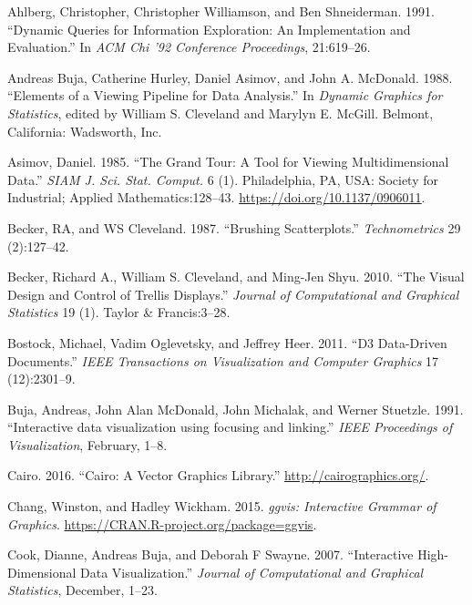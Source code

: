\documentclass[12pt,]{article}
\theoremstyle{definition}
\theoremstyle{definition}
\theoremstyle{definition}
\theoremstyle{remark}
\begin{document}
\hypertarget{refs}{}
\leavevmode\hypertarget{ref-Ahlberg:1991}{}%
Ahlberg, Christopher, Christopher Williamson, and Ben Shneiderman. 1991.
``Dynamic Queries for Information Exploration: An Implementation and
Evaluation.'' In \emph{ACM Chi '92 Conference Proceedings}, 21:619--26.

\leavevmode\hypertarget{ref-viewing-pipeline}{}%
Andreas Buja, Catherine Hurley, Daniel Asimov, and John A. McDonald.
1988. ``Elements of a Viewing Pipeline for Data Analysis.'' In
\emph{Dynamic Graphics for Statistics}, edited by William S. Cleveland
and Marylyn E. McGill. Belmont, California: Wadsworth, Inc.

\leavevmode\hypertarget{ref-grand-tour}{}%
Asimov, Daniel. 1985. ``The Grand Tour: A Tool for Viewing
Multidimensional Data.'' \emph{SIAM J. Sci. Stat. Comput.} 6 (1).
Philadelphia, PA, USA: Society for Industrial; Applied
Mathematics:128--43. \url{https://doi.org/10.1137/0906011}.

\leavevmode\hypertarget{ref-brushing-scatterplots}{}%
Becker, RA, and WS Cleveland. 1987. ``Brushing Scatterplots.''
\emph{Technometrics} 29 (2):127--42.

\leavevmode\hypertarget{ref-trellis}{}%
Becker, Richard A., William S. Cleveland, and Ming-Jen Shyu. 2010. ``The
Visual Design and Control of Trellis Displays.'' \emph{Journal of
Computational and Graphical Statistics} 19 (1). Taylor \& Francis:3--28.

\leavevmode\hypertarget{ref-d3}{}%
Bostock, Michael, Vadim Oglevetsky, and Jeffrey Heer. 2011. ``D3
Data-Driven Documents.'' \emph{IEEE Transactions on Visualization and
Computer Graphics} 17 (12):2301--9.

\leavevmode\hypertarget{ref-Buja:1991vh}{}%
Buja, Andreas, John Alan McDonald, John Michalak, and Werner Stuetzle.
1991. ``Interactive data visualization using focusing and linking.''
\emph{IEEE Proceedings of Visualization}, February, 1--8.

\leavevmode\hypertarget{ref-cairo}{}%
Cairo. 2016. ``Cairo: A Vector Graphics Library.''
\url{http://cairographics.org/}.

\leavevmode\hypertarget{ref-ggvis}{}%
Chang, Winston, and Hadley Wickham. 2015. \emph{ggvis: Interactive
Grammar of Graphics}. \url{https://CRAN.R-project.org/package=ggvis}.

\leavevmode\hypertarget{ref-Cook:2007uk}{}%
Cook, Dianne, Andreas Buja, and Deborah F Swayne. 2007. ``Interactive
High-Dimensional Data Visualization.'' \emph{Journal of Computational
and Graphical Statistics}, December, 1--23.
\end{document}
